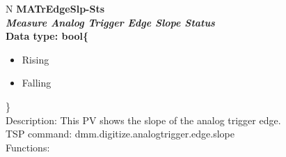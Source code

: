 \documentclass[openany]{article}
\begin{document}
		\begin{tabular}{N}
			\hline
			\bfseries MATrEdgeSlp-Sts\label{pv:matredgeslp-sts} \\ \hline
			\emph{Measure Analog Trigger Edge Slope Status} \\
			Data type: bool\{\begin{itemize}[noitemsep]
				\small
				\item[] Rising
				\item[] Falling
			\end{itemize}\} \\
			Description: This PV shows the slope of the analog trigger edge. \\
			TSP command: dmm.digitize.analogtrigger.edge.slope \\
			Functions: \\
			\arrayrulecolor{\FuncTableBorderColor}

		\end{tabular}
\end{document}

